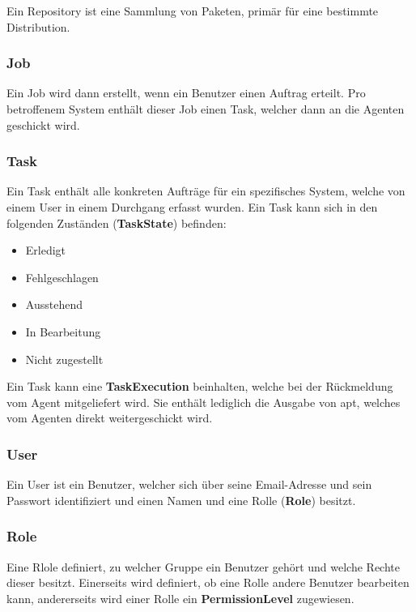 Ein Repository ist eine Sammlung von Paketen, primär für eine bestimmte Distribution.

\subsubsection{Job}

Ein Job wird dann erstellt, wenn ein Benutzer einen Auftrag erteilt. Pro betroffenem System enthält dieser Job einen Task, welcher dann an die Agenten geschickt wird.

\subsubsection{Task}

Ein Task enthält alle konkreten Aufträge für ein spezifisches System, welche von einem User in einem Durchgang erfasst wurden. Ein Task kann sich in den folgenden Zuständen (\textbf{TaskState}) befinden:

\begin{itemize}
    \item Erledigt 
    \item Fehlgeschlagen 
    \item Ausstehend
    \item In Bearbeitung
    \item Nicht zugestellt
\end{itemize}

Ein Task kann eine \textbf{TaskExecution} beinhalten, welche bei der Rückmeldung vom Agent mitgeliefert wird. Sie enthält lediglich die Ausgabe von \gls{apt}, welches vom Agenten direkt weitergeschickt wird.

\subsubsection{User}

Ein User ist ein Benutzer, welcher sich über seine Email-Adresse und sein Passwort identifiziert und einen Namen und eine Rolle (\textbf{Role}) besitzt.

\subsubsection{Role}

Eine Rlole definiert, zu welcher Gruppe ein Benutzer gehört und welche Rechte dieser besitzt. Einerseits wird definiert, ob eine Rolle andere Benutzer bearbeiten kann, andererseits wird einer Rolle ein \textbf{PermissionLevel} zugewiesen.

